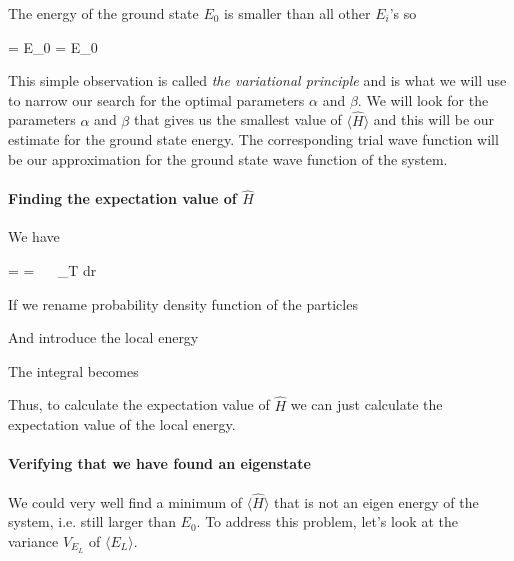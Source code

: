 The energy of the ground state $E_0$ is smaller than all other $E_i$'s so 

\eqs
{} \geq {} = E_0  = E_0
\eqf
\eqs
{}
\eqf

This simple observation is called \textit{the variational principle} and is what we will use to narrow our search for the optimal parameters $\alpha$ and $\beta$.
We will look for the parameters $\alpha$ and $\beta$ that gives us the smallest value of $\langle \hat{H} \rangle$ and this will be our estimate for the ground state energy. 
The corresponding trial wave function will be our approximation for the ground state wave function of the system. 







\paragraph{Finding the expectation value of $\hat{H}$}

We have

\eqs
\langle {} \rangle =  
=
\int ~~   \Psi_T d\vec r
\eqf

If we rename probability density function of the particles 

\eqs 
{}
\eqf

And introduce the local energy 

\eqs
{}
\eqf

The integral becomes 

\eqs
{}
\eqf

Thus, to calculate the expectation value of $\hat{H}$ we can just calculate the expectation value of the local energy.



\paragraph{Verifying that we have found an eigenstate}

We could very well find a minimum of $\langle \hat{H} \rangle$ that is not an eigen energy of the system, i.e. still larger than $E_0$.
To address this problem, let's look at the variance $V_{E_L}$ of $\langle E_L \rangle$. 


